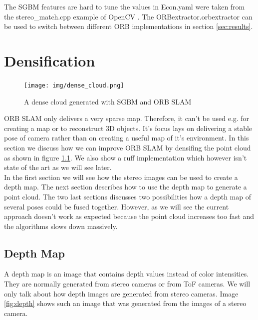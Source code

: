 \documentclass[11pt,a4paper,titlepage,oneside]{report}
\begin{document}
The SGBM features are hard to tune the values in Econ.yaml were taken from the stereo\_match.cpp example of OpenCV \cite{opencv_se}. The ORBextractor.orbextractor can be used to switch between different ORB implementations in section \ref{sec:results}.

\chapter{Densification}

\begin{figure}[H]
  \begin{center}
		\texttt{[image: img/dense\_cloud.png]}
  \end{center}
	\caption{A dense cloud generated with SGBM and ORB SLAM}\label{fig:dense_cloud}
\end{figure}

ORB SLAM only delivers a very sparse map. Therefore, it can't be used e.g. for creating a map or to reconstruct 3D objects. It's focus lays on delivering a stable pose of camera rather than on creating a useful map of it's environment. In this section we discuss how we can improve ORB SLAM by densifing the point cloud as shown in figure \ref{fig:dense_cloud}. We also show a ruff implementation which however isn't state of the art as we will see later.\\
In the first section we will see how the stereo images can be used to create a depth map. The next section describes how to use the depth map to generate a point cloud. The two last sections discusses two possibilities how a depth map of several poses could be fused together. However, as we will see the current approach doesn't work as expected because the point cloud increases too fast and the algorithms slows down massively.

\section{Depth Map}

A depth map is an image that contains depth values instead of color intensities. They are normally generated from stereo cameras or from ToF cameras. We will only talk about how depth images are generated from stereo cameras. Image \ref{fig:depth} shows such an image that was generated from the images of a stereo camera.
\end{document}
